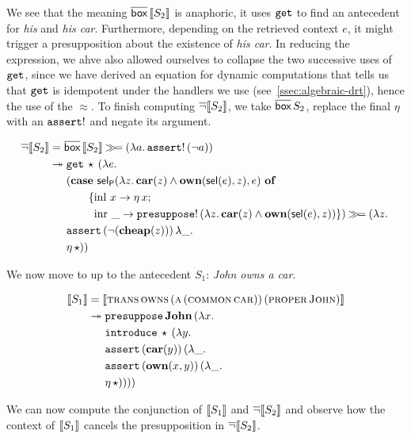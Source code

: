 We see that the meaning $\overline{\textsf{box}}\,\llbracket S_2 \rrbracket$ is anaphoric, it uses
$\mathtt{get}$ to find an antecedent for \emph{his} and \emph{his
  car}. Furthermore, depending on the retrieved context $e$, it might
trigger a presupposition about the existence of \emph{his car}. In reducing
the expression, we ahve also allowed ourselves to collapse the two
successive uses of $\mathtt{get}$, since we have derived an equation for
dynamic computations that tells us that $\mathtt{get}$ is idempotent under the
handlers we use (see~\ref{ssec:algebraic-drt}), hence the use of the
$\approx$. To finish computing $\mathop{\overline{\lnot}} \llbracket S_2 \rrbracket$, we take
$\overline{\textsf{box}}\,S_2$, replace the final $\eta$ with an $\mathtt{assert}!$ and
negate its argument.

\begin{align*}
  \mathop{\overline{\lnot}} \llbracket S_2 \rrbracket
  &= \overline{\textsf{box}}\,\llbracket S_2 \rrbracket \mathbin{\gg\!=} (\lambda a.\, \mathtt{assert}!\,(\lnot a)) \\
  &\twoheadrightarrow \begin{aligned}[t]
    &\mathtt{get}\,\star\,(\lambda e.\,  \\
    &(\text{\textbf{case} $\textsf{sel}_{\textsf{P}}(\lambda z.\, \textbf{car}(z) \land \textbf{own}(\textsf{sel}(e), z), e)$ \textbf{of}} \\ &\qquad \{\operatorname{inl}\,x \to \eta\,x; \\ &\qquad \ \operatorname{inr}\,\_ \to \mathtt{presuppose}!\,(\lambda z.\, \textbf{car}(z) \land \textbf{own}(\textsf{sel}(e), z)) \}) \mathbin{\gg\!=} (\lambda z.\,  \\
    &\mathtt{assert}\,(\lnot (\textbf{cheap}(z)))\,\lambda \_.\,  \\
    &\eta\,\star))
    \end{aligned}
\end{align*}

We now move to up to the antecedent $S_1$: \emph{John owns a car}.

\begin{align*}
  \llbracket S_1 \rrbracket
  &= \llbracket \textsc{trans}\,\textsc{owns}\,(\textsc{a}\,(\textsc{common}\,\textsc{car}))\,(\textsc{proper}\,\textsc{John}) \rrbracket \\
  &\twoheadrightarrow \begin{aligned}[t]
      &\mathtt{presuppose}\,\textbf{John}\,(\lambda x.\,  \\
      &\mathtt{introduce}\,\star\,(\lambda y.\,  \\
      &\mathtt{assert}\,(\textbf{car}(y))\,(\lambda \_.\,  \\
      &\mathtt{assert}\,(\textbf{own}(x, y))\,(\lambda \_.\,  \\
      &\eta\,\star))))
    \end{aligned}
\end{align*}

We can now compute the conjunction of $\llbracket S_1 \rrbracket$ and $\mathop{\overline{\lnot}} \llbracket S_2 \rrbracket$ and
observe how the context of $\llbracket S_1 \rrbracket$ cancels the presupposition in
$\mathop{\overline{\lnot}} \llbracket S_2 \rrbracket$.

